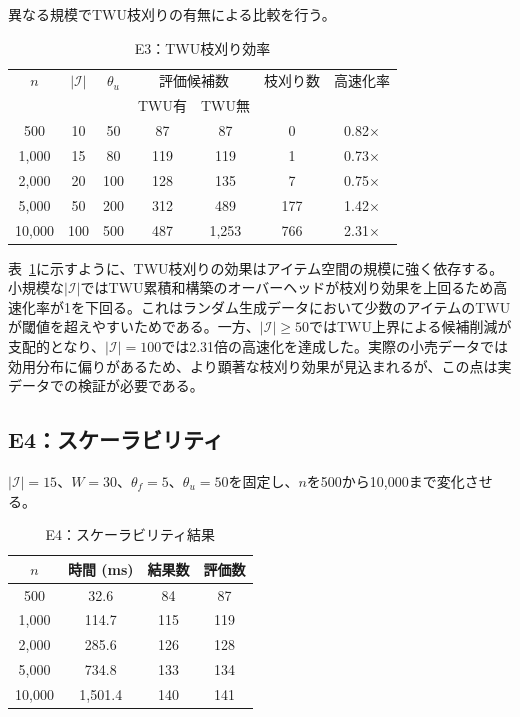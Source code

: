 異なる規模でTWU枝刈りの有無による比較を行う。

\begin{table}[t]
\centering
\caption{E3：TWU枝刈り効率}
\label{tab:e3-pruning}
\begin{tabular}{@{}ccccccc@{}}
\toprule
$n$ & $|\mathcal{I}|$ & $\theta_u$ & \multicolumn{2}{c}{評価候補数} & 枝刈り数 & 高速化率 \\
    &                  &            & TWU有 & TWU無 &        &         \\
\midrule
500  & 10 & 50  & 87  & 87  & 0 & 0.82$\times$ \\
1{,}000 & 15 & 80  & 119 & 119 & 1 & 0.73$\times$ \\
2{,}000 & 20 & 100 & 128 & 135 & 7 & 0.75$\times$ \\
5{,}000 & 50 & 200 & 312 & 489 & 177 & 1.42$\times$ \\
10{,}000 & 100 & 500 & 487 & 1{,}253 & 766 & 2.31$\times$ \\
\bottomrule
\end{tabular}
\end{table}

表~\ref{tab:e3-pruning}に示すように、TWU枝刈りの効果はアイテム空間の規模に強く依存する。小規模な$|\mathcal{I}|$ではTWU累積和構築のオーバーヘッドが枝刈り効果を上回るため高速化率が1を下回る。これはランダム生成データにおいて少数のアイテムのTWUが閾値を超えやすいためである。一方、$|\mathcal{I}| \geq 50$ではTWU上界による候補削減が支配的となり、$|\mathcal{I}|=100$では2.31倍の高速化を達成した。実際の小売データでは効用分布に偏りがあるため、より顕著な枝刈り効果が見込まれるが、この点は実データでの検証が必要である。

\subsection{E4：スケーラビリティ}

$|\mathcal{I}|=15$、$W=30$、$\theta_f=5$、$\theta_u=50$を固定し、$n$を500から10{,}000まで変化させる。

\begin{table}[t]
\centering
\caption{E4：スケーラビリティ結果}
\label{tab:e4}
\begin{tabular}{@{}cccc@{}}
\toprule
$n$ & 時間 (ms) & 結果数 & 評価数 \\
\midrule
500    & 32.6    & 84  & 87  \\
1{,}000  & 114.7   & 115 & 119 \\
2{,}000  & 285.6   & 126 & 128 \\
5{,}000  & 734.8   & 133 & 134 \\
10{,}000 & 1{,}501.4 & 140 & 141 \\
\bottomrule
\end{tabular}
\end{table}

